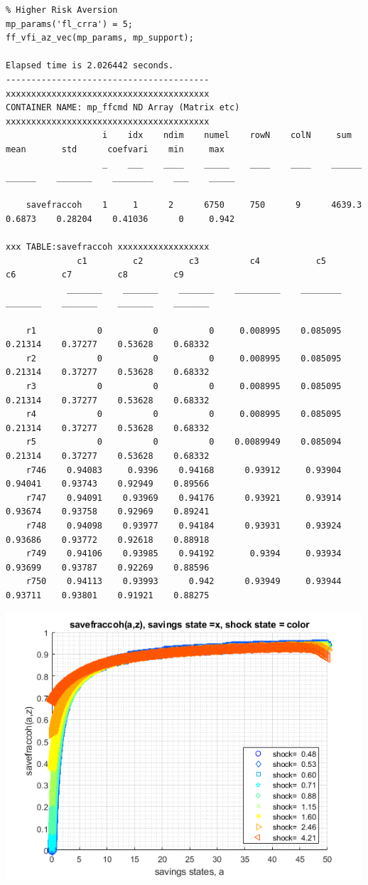 \documentclass[
]{book}
\begin{document}
\begin{verbatim}
% Higher Risk Aversion
mp_params('fl_crra') = 5;
ff_vfi_az_vec(mp_params, mp_support);

Elapsed time is 2.026442 seconds.
----------------------------------------
xxxxxxxxxxxxxxxxxxxxxxxxxxxxxxxxxxxxxxxx
CONTAINER NAME: mp_ffcmd ND Array (Matrix etc)
xxxxxxxxxxxxxxxxxxxxxxxxxxxxxxxxxxxxxxxx
                   i    idx    ndim    numel    rowN    colN     sum       mean       std      coefvari    min     max 
                   _    ___    ____    _____    ____    ____    ______    ______    _______    ________    ___    _____

    savefraccoh    1     1      2      6750     750      9      4639.3    0.6873    0.28204    0.41036      0     0.942

xxx TABLE:savefraccoh xxxxxxxxxxxxxxxxxx
              c1         c2         c3          c4           c5         c6         c7         c8         c9   
            _______    _______    _______    _________    ________    _______    _______    _______    _______

    r1            0          0          0     0.008995    0.085095    0.21314    0.37277    0.53628    0.68332
    r2            0          0          0     0.008995    0.085095    0.21314    0.37277    0.53628    0.68332
    r3            0          0          0     0.008995    0.085095    0.21314    0.37277    0.53628    0.68332
    r4            0          0          0     0.008995    0.085095    0.21314    0.37277    0.53628    0.68332
    r5            0          0          0    0.0089949    0.085094    0.21314    0.37277    0.53628    0.68332
    r746    0.94083     0.9396    0.94168      0.93912     0.93904    0.94041    0.93743    0.92949    0.89566
    r747    0.94091    0.93969    0.94176      0.93921     0.93914    0.93674    0.93758    0.92969    0.89241
    r748    0.94098    0.93977    0.94184      0.93931     0.93924    0.93686    0.93772    0.92618    0.88918
    r749    0.94106    0.93985    0.94192       0.9394     0.93934    0.93699    0.93787    0.92269    0.88596
    r750    0.94113    0.93993      0.942      0.93949     0.93944    0.93711    0.93801    0.91921    0.88275
\end{verbatim}

\includegraphics[width=5.20833in,height=\textheight]{img/fx_vfi_az_vec_images/figure_4.png}
\end{document}
